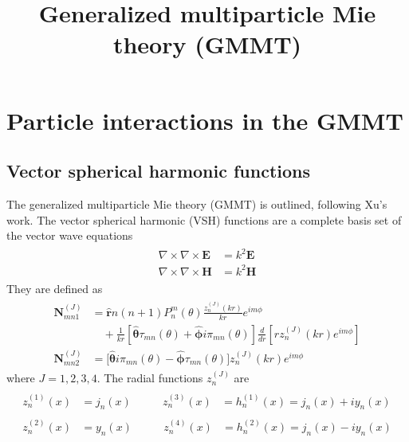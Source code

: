 \documentclass[11pt]{article}
\title{Generalized multiparticle Mie theory (GMMT)}
\date{}
\author{}
\begin{document}
\maketitle
\tableofcontents

\section{Particle interactions in the GMMT}
\subsection{Vector spherical harmonic functions}

The generalized multiparticle Mie theory (GMMT) is outlined, following Xu's work. \cite{xu1995electromagnetic}
The vector spherical harmonic (VSH) functions are a complete basis set of the vector wave equations
\begin{align}
    \begin{split}
        \nabla \times \nabla \times \boldsymbol{E} &= k^2 \boldsymbol{E} \\
        \nabla \times \nabla \times \boldsymbol{H} &= k^2 \boldsymbol{H}
    \end{split}
\end{align}
They are defined as
\begin{align}
    \begin{split}
        \boldsymbol{N}_{mn1}^{(J)} &= 
        \boldsymbol{\hat r} n(n+1) P_n^m(\theta) \frac{z_n^{(J)}(kr)}{kr}e^{im\phi} \\
        &\quad + \frac{1}{kr} \left[ \boldsymbol{\hat \theta} \tau_{mn}(\theta) + \boldsymbol{\hat \phi} i\pi_{mn}(\theta) \right]
        \frac{d}{dr} \left[ rz_n^{(J)}(kr)e^{im\phi} \right] \\
        \boldsymbol{N}_{mn2}^{(J)} &= \big[
        \boldsymbol{\hat \theta} i\pi_{mn}(\theta) 
       -\boldsymbol{\hat \phi} \tau_{mn}(\theta) \big] z_n^{(J)}(kr) e^{im\phi} 
    \end{split}
\label{eqn:vsh_definition}
\end{align}
where $J= 1,2,3,4$. The radial functions $z_n^{(J)}$ are
\begin{align}
\begin{split}
    \begin{aligned}
        z_n^{(1)}(x) &= j_n(x)  \qquad&  z_n^{(3)}(x) &= h_n^{(1)}(x) = j_n(x) + iy_n(x)
    \end{aligned}\\
    \begin{aligned}
        z_n^{(2)}(x) &= y_n(x)  \qquad&  z_n^{(4)}(x) &= h_n^{(2)}(x) = j_n(x) - iy_n(x)
    \end{aligned}
\end{split}
\end{align}
\end{document}
